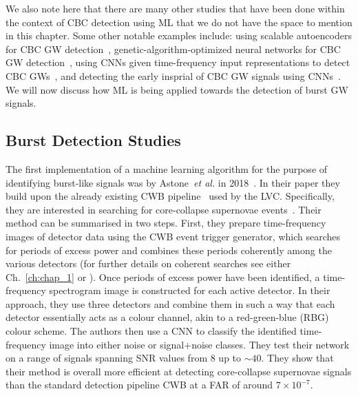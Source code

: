 %
% 
We also note here that there are many other studies that have been done 
within the context of \ac{CBC} detection using \ac{ML} that we 
do not have the space to mention in this chapter. Some other notable 
examples include: using scalable autoencoders for \ac{CBC} \ac{GW} 
detection~\cite{CORIZZO2020113378}, genetic-algorithm-optimized neural 
networks for \ac{CBC} \ac{GW} detection~\cite{2020arXiv201004340D}, using 
\ac{CNN}s given time-frequency input representations to detect \ac{CBC} 
\ac{GW}s~\cite{9412180},  and detecting the early insprial of \ac{CBC} \ac{GW} 
signals using \ac{CNN}s~\cite{2021arXiv210513664B}. We will now 
discuss how \ac{ML} is being applied towards the detection 
of burst \ac{GW} signals.

%
%
\subsection{Burst Detection Studies}

%
% 
The first implementation of a machine learning algorithm for the 
purpose of identifying burst-like signals was by Astone~\textit{et al.} 
in 2018~\cite{2018PhRvD..98l2002A}. In their paper they 
build upon the already existing \ac{CWB} pipeline~\cite{PhysRevD.72.122002} 
used by the \ac{LVC}. Specifically, they are interested in 
searching for core-collapse supernovae
events~\cite{Ott_2009}. Their method can be 
summarised in two steps. First, they prepare time-frequency 
images of detector data using the \ac{CWB} event trigger generator,
which searches 
for periods of excess power and combines these 
periods coherently among the various detectors (for further 
details on coherent searches see 
either Ch.~\ref{ch:chap_1} or \cite{PhysRevD.72.122002}).
Once periods of excess power have been identified, a time-frequency 
spectrogram image is constructed for each active detector. 
In their approach, they use three detectors and 
combine them in such a way that each detector essentially acts as a colour
channel, akin to a red-green-blue (RBG) colour scheme. The authors then 
use a \ac{CNN} to classify the identified time-frequency image into 
either noise or signal+noise classes. They test their network on a 
range of signals spanning \ac{SNR} values from 8 up to $\sim 40$. They 
show that their method is overall more efficient at detecting 
core-collapse supernovae signals than the standard detection pipeline \ac{CWB} at a \ac{FAR} of around $7 \times 10^{-7}$.

